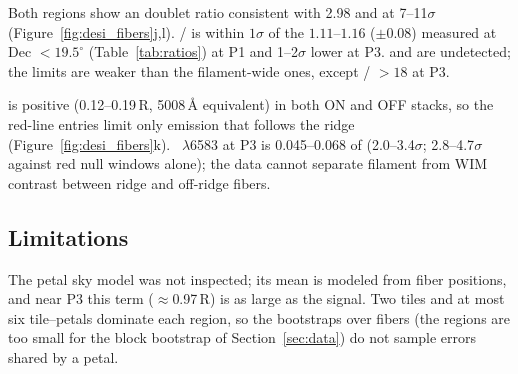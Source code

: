 Both regions show an \Oiii{} doublet ratio consistent with 2.98 and \Oii{} at 7--11$\sigma$ (Figure~\ref{fig:desi_fibers}j,l). \Oii/\Oiii{} is within $1\sigma$ of the $1.11$--$1.16$ ($\pm0.08$) measured at Dec $<19.5^\circ$ (Table~\ref{tab:ratios}) at P1 and 1--2$\sigma$ lower at P3. \Hb{} and  are undetected; the limits are weaker than the filament-wide ones, except \Oiii/\Hb{} $>18$ at P3.

\Ha{} is positive (0.12--0.19\,R, 5008\,\AA{} equivalent) in both ON and OFF stacks, so the red-line entries limit only emission that follows the \Oiii{} ridge (Figure~\ref{fig:desi_fibers}k). \Nii~$\lambda$6583 at P3 is 0.045--0.068 of \Oiii{} (2.0--3.4$\sigma$; 2.8--4.7$\sigma$ against red null windows alone); the data cannot separate filament \Nii{} from WIM contrast between ridge and off-ridge fibers.

\subsection{Limitations}

The petal sky model was not inspected; its mean is modeled from fiber positions, and near P3 this term ($\approx$0.97\,R) is as large as the signal. Two tiles and at most six tile--petals dominate each region, so the bootstraps over fibers (the regions are too small for the block bootstrap of Section~\ref{sec:data}) do not sample errors shared by a petal.

